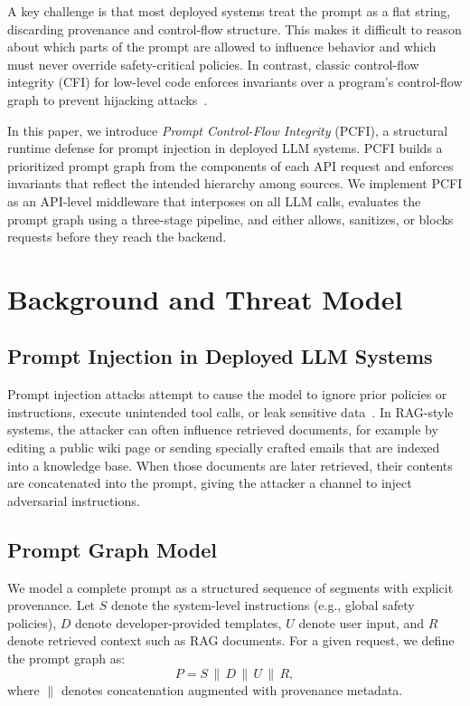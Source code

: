 \documentclass[conference]{IEEEtran}
\begin{document}
A key challenge is that most deployed systems treat the prompt as a flat string, discarding provenance and control-flow structure. This makes it difficult to reason about which parts of the prompt are allowed to influence behavior and which must never override safety-critical policies. In contrast, classic control-flow integrity (CFI) for low-level code enforces invariants over a program's control-flow graph to prevent hijacking attacks~\cite{abadi_cfi}.

In this paper, we introduce \emph{Prompt Control-Flow Integrity} (PCFI), a structural runtime defense for prompt injection in deployed LLM systems. PCFI builds a prioritized prompt graph from the components of each API request and enforces invariants that reflect the intended hierarchy among sources. We implement PCFI as an API-level middleware that interposes on all LLM calls, evaluates the prompt graph using a three-stage pipeline, and either allows, sanitizes, or blocks requests before they reach the backend.

\section{Background and Threat Model}

\subsection{Prompt Injection in Deployed LLM Systems}

Prompt injection attacks attempt to cause the model to ignore prior policies or instructions, execute unintended tool calls, or leak sensitive data~\cite{sok_prompt_hacking,rag_n_roll}. In RAG-style systems, the attacker can often influence retrieved documents, for example by editing a public wiki page or sending specially crafted emails that are indexed into a knowledge base. When those documents are later retrieved, their contents are concatenated into the prompt, giving the attacker a channel to inject adversarial instructions.

\subsection{Prompt Graph Model}

We model a complete prompt as a structured sequence of segments with explicit provenance. Let $S$ denote the system-level instructions (e.g., global safety policies), $D$ denote developer-provided templates, $U$ denote user input, and $R$ denote retrieved context such as RAG documents. For a given request, we define the prompt graph as:
\begin{equation}
P = S \,\|\, D \,\|\, U \,\|\, R,
\end{equation}
where $\|$ denotes concatenation augmented with provenance metadata.
\end{document}
